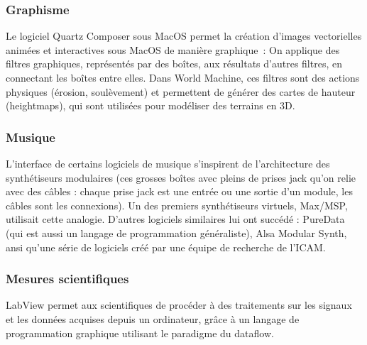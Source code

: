 \documentclass{article}
\begin{document}
\subsubsection{Graphisme}

Le logiciel Quartz Composer sous MacOS permet la création d'images vectorielles animées et interactives sous MacOS de manière graphique~: On
applique des filtres graphiques, représentés par des boîtes, aux résultats d'autres filtres, en connectant les boîtes entre elles. Dans
World Machine, ces filtres sont des actions physiques (érosion, soulèvement) et permettent de générer des cartes de hauteur (heightmaps),
qui sont utilisées pour modéliser des terrains en 3D.

\subsubsection{Musique}

L'interface de certains logiciels de musique s'inspirent de l'architecture des synthétiseurs modulaires\cite{modular-synth} (ces grosses
boîtes avec pleins de prises jack qu'on relie avec des câbles : chaque prise jack est une entrée ou une sortie d'un module, les câbles sont
les connexions). Un des premiers synthétiseurs virtuels, Max/MSP, utilisait cette analogie. D'autres logiciels similaires lui ont succédé :
PureData (qui est aussi un langage de programmation généraliste), Alsa Modular Synth, ansi qu'une série de logiciels créé par une équipe de
recherche de l'ICAM\cite{musique-ircam}.

\subsubsection{Mesures scientifiques}

LabView permet aux scientifiques de procéder à des traitements sur les signaux et les données acquises depuis un ordinateur, grâce à un
langage de programmation graphique utilisant le paradigme du dataflow.
\end{document}
